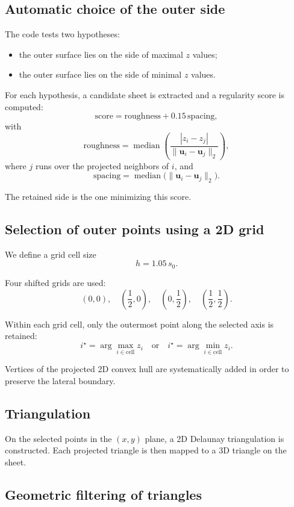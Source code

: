\documentclass[11pt,a4paper]{article}
\begin{document}
\subsection{Automatic choice of the outer side}

The code tests two hypotheses:
\begin{itemize}
  \item the outer surface lies on the side of maximal $z$ values;
  \item the outer surface lies on the side of minimal $z$ values.
\end{itemize}

For each hypothesis, a candidate sheet is extracted and a regularity score is computed:
\[
\mathrm{score}=
\mathrm{roughness}
+0.15\,\mathrm{spacing},
\]
with
\[
\mathrm{roughness}
=
\operatorname{median}\left(
\frac{|z_i-z_j|}{\|\mathbf{u}_i-\mathbf{u}_j\|_2}
\right),
\]
where $j$ runs over the projected neighbors of $i$, and
\[
\mathrm{spacing}
=
\operatorname{median}\big(\|\mathbf{u}_i-\mathbf{u}_j\|_2\big).
\]

The retained side is the one minimizing this score.

\subsection{Selection of outer points using a 2D grid}

We define a grid cell size
\[
h=1.05\,s_0.
\]

Four shifted grids are used:
\[
(0,0),\quad
\left(\frac{1}{2},0\right),\quad
\left(0,\frac{1}{2}\right),\quad
\left(\frac{1}{2},\frac{1}{2}\right).
\]

Within each grid cell, only the outermost point along the selected axis is retained:
\[
i^\star=\arg\max_{i\in \text{cell}} z_i
\quad\text{or}\quad
i^\star=\arg\min_{i\in \text{cell}} z_i.
\]

Vertices of the projected 2D convex hull are systematically added in order to preserve the lateral boundary.

\subsection{Triangulation}

On the selected points in the $(x,y)$ plane, a 2D Delaunay triangulation is constructed. Each projected triangle is then mapped to a 3D triangle on the sheet.

\subsection{Geometric filtering of triangles}
\end{document}
